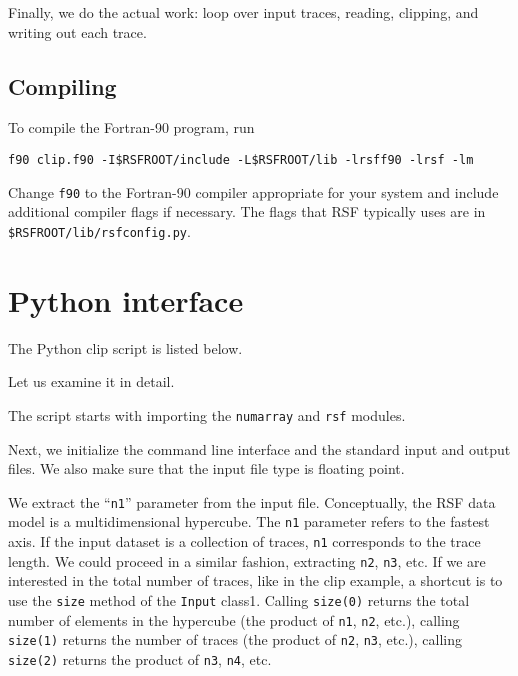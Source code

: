 
Finally, we do the actual work: loop over input traces, reading, clipping, and
writing out each trace. 

\subsection{Compiling}
To compile the Fortran-90 program, run
\begin{verbatim}
f90 clip.f90 -I$RSFROOT/include -L$RSFROOT/lib -lrsff90 -lrsf -lm
\end{verbatim}
Change \texttt{f90} to the Fortran-90 compiler appropriate for your system and
include additional compiler flags if necessary. The flags that RSF typically
uses are in \texttt{\$RSFROOT/lib/rsfconfig.py}.

\section{Python interface}

\lstset{language=python}

The Python clip script is listed below.



Let us examine it in detail. 

 The
script starts with importing the \texttt{numarray} and \texttt{rsf} modules.


Next, we initialize the command line interface and the standard input and
output files. We also make sure that the input file type is floating point.


We extract the ``\texttt{n1}'' parameter from the input file. Conceptually,
the RSF data model is a multidimensional hypercube.  The \texttt{n1} parameter
refers to the fastest axis. If the input dataset is a collection of traces,
\texttt{n1} corresponds to the trace length. We could proceed in a similar
fashion, extracting \texttt{n2}, \texttt{n3}, etc. If we are interested in the
total number of traces, like in the clip example, a shortcut is to use the
\texttt{size} method of the \texttt{Input} class1.  Calling \texttt{size(0)}
returns the total number of elements in the hypercube (the product of
\texttt{n1}, \texttt{n2}, etc.), calling \texttt{size(1)} returns the number
of traces (the product of \texttt{n2}, \texttt{n3}, etc.), calling
\texttt{size(2)} returns the product of \texttt{n3}, \texttt{n4}, etc.

